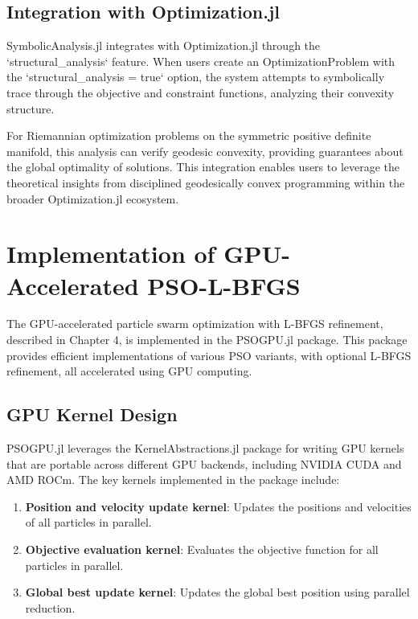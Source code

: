 \subsection{Integration with Optimization.jl}

SymbolicAnalysis.jl integrates with Optimization.jl through the `structural_analysis` feature. When users create an OptimizationProblem with the `structural_analysis = true` option, the system attempts to symbolically trace through the objective and constraint functions, analyzing their convexity structure.

For Riemannian optimization problems on the symmetric positive definite manifold, this analysis can verify geodesic convexity, providing guarantees about the global optimality of solutions. This integration enables users to leverage the theoretical insights from disciplined geodesically convex programming within the broader Optimization.jl ecosystem.

\section{Implementation of GPU-Accelerated PSO-L-BFGS}

The GPU-accelerated particle swarm optimization with L-BFGS refinement, described in Chapter 4, is implemented in the PSOGPU.jl package. This package provides efficient implementations of various PSO variants, with optional L-BFGS refinement, all accelerated using GPU computing.

\subsection{GPU Kernel Design}

PSOGPU.jl leverages the KernelAbstractions.jl package for writing GPU kernels that are portable across different GPU backends, including NVIDIA CUDA and AMD ROCm. The key kernels implemented in the package include:

\begin{enumerate}
\item \textbf{Position and velocity update kernel}: Updates the positions and velocities of all particles in parallel.

\item \textbf{Objective evaluation kernel}: Evaluates the objective function for all particles in parallel.

\item \textbf{Global best update kernel}: Updates the global best position using parallel reduction.
\end{enumerate}

